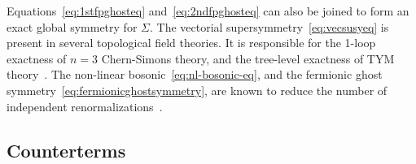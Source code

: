 \documentclass[../main.tex]{subfiles}
\begin{document}
Equations~\eqref{eq:1stfpghosteq} and~\eqref{eq:2ndfpghosteq} can also be joined to form an exact global symmetry for $ \Sigma  $. The vectorial supersymmetry~\eqref{eq:vecsusyeq} is present in several topological field theories. It is responsible for the 1-loop exactness of $ n=3 $ Chern-Simons theory, and the tree-level exactness of TYM theory~\cite{birmingham1991a,werneck1993a,brandhuber1994a,piguet1995a,sadovski2017c,sadovski2018a}. The non-linear bosonic~\eqref{eq:nl-bosonic-eq}, and the fermionic ghost symmetry~\eqref{eq:fermionicghostsymmetry}, are known to reduce the number of independent renormalizations~\cite{sadovski2017c}.

\subsection{Counterterms}%
\label{ssec:counterterm}
\end{document}
